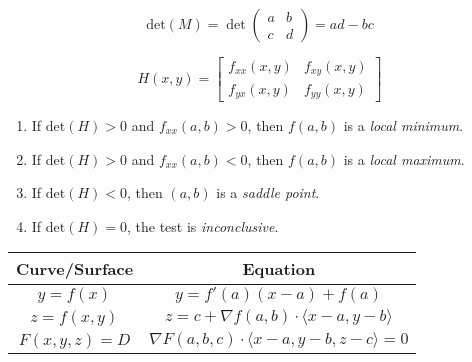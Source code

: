 \documentclass{report}
\begin{document}
\pagebreak

\[
		\text{det}(M) = \det\begin{pmatrix} a & b \\ c & d \end{pmatrix} = ad - bc
\]

\[
	H(x, y) = \begin{bmatrix}
		f_{xx}(x, y) & f_{xy}(x, y) \\
		f_{yx}(x, y) & f_{yy}(x, y)
	\end{bmatrix}
\]

\begin{center}
	\begin{enumerate}
		\item If \( \text{det}(H) > 0 \) and \( f_{xx}(a, b) > 0 \), then \( f(a, b) \) is a \emph{local minimum}.
		\item If \( \text{det}(H) > 0 \) and \( f_{xx}(a, b) < 0 \), then \( f(a, b) \) is a \emph{local maximum}.
		\item If \( \text{det}(H) < 0 \), then \( (a, b) \) is a \emph{saddle point}.
		\item If \( \text{det}(H) = 0 \), the test is \emph{inconclusive}.
	\end{enumerate}
\end{center}

\begin{center}
	\begin{tabular}{|c|c|}
		\hline
		\textbf{Curve/Surface} & \textbf{Equation}                                                     \\
		\hline
		\( y = f(x) \)         & \( y = f'(a)(x - a) + f(a) \)                                         \\
		\( z = f(x, y) \)      & \( z = c + \nabla f(a, b) \cdot \langle x - a, y - b \rangle \)       \\
		\( F(x, y, z) = D \)   & \( \nabla F(a, b, c) \cdot \langle x - a, y - b, z - c \rangle = 0 \) \\
		\hline
	\end{tabular}
\end{center}
\end{document}
